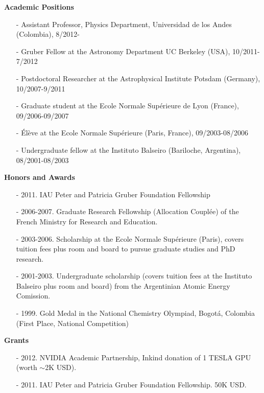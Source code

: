 \documentclass[9pt]{article}
\begin{document}
{\bf Academic Positions}
\begin{itemize}
\item[-] Assistant Professor, Physics Department, Universidad de los Andes (Colombia), 8/2012-
\item[-] Gruber Fellow at the Astronomy Department UC Berkeley (USA), 10/2011-7/2012
\item[-] Postdoctoral Researcher at the Astrophysical Institute Potsdam (Germany), 10/2007-9/2011  
\item[-] Graduate student at the Ecole Normale Sup\'erieure de Lyon (France), 09/2006-09/2007 
\item[-] \'El\`eve at the Ecole Normale Sup\'erieure (Paris, France), 09/2003-08/2006
\item[-] Undergraduate fellow at the Instituto Balseiro (Bariloche, Argentina), 08/2001-08/2003
\end{itemize}

\newpage
{\bf Honors and Awards}
\begin{itemize}
\item[-] 2011. IAU Peter and Patricia Gruber Foundation Fellowship
\item[-] 2006-2007. Graduate Research Fellowship (Allocation Coupl\'ee) of the French
  Ministry for Research and Education.
\item[-] 2003-2006. Scholarship at the Ecole Normale Sup\'erieure (Paris), covers tuition fees plus room and
  board to pursue graduate studies and PhD research.
\item[-] 2001-2003. Undergraduate scholarship (covers tuition fees at the
  Instituto Balseiro plus room and board) from the Argentinian Atomic Energy
  Comission.
\item[-] 1999. Gold Medal in the National Chemistry Olympiad, Bogot\'a,
  Colombia (First Place, National Competition)
\end{itemize}

{\bf Grants}
\begin{itemize}
\item[-] 2012. NVIDIA Academic Partnership, Inkind donation of 1 TESLA GPU (worth $\sim$2K USD).
\item[-] 2011. IAU Peter and Patricia Gruber Foundation Fellowship. 50K USD.
\end{itemize}
\end{document}
